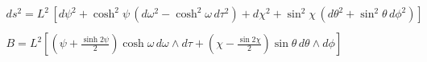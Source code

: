 \begin{equation}
\begin{array}{c}
ds^2 = L^2\,[d\psi^2+\cosh^2\psi\,(d\omega^2-\cosh^2\omega\,d\tau^2)
           +d\chi^2+\sin^2\chi\,(d\theta^2+\sin^2\theta\,d\phi^2)] \\ \\
\displaystyle
B=L^2\left[
  \left(\psi+\frac{\sinh2\psi}{2}\right)\cosh\omega\,d\omega\wedge d\tau +
  \left(\chi-\frac{\sin2\chi}{2}\right)\sin\theta\,d\theta\wedge d\phi
\right]
\end{array}
\end{equation}

